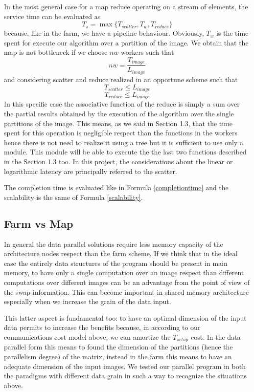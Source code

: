 In the most general case for a map reduce operating on a stream of elements, the service time can be evaluated as
\[
T_{s} = \max\lbrace T_{scatter}, T_{w}, T_{reduce}\rbrace
\]
because, like in the farm, we have a pipeline behaviour. Obviously, $T_{w}$ is the time spent for execute our algorithm over a partition of the image. We obtain that the map is not bottleneck if we choose $nw$ workers such that
\[
nw = \frac{T_{image}}{L_{image}}
\]
and considering scatter and reduce realized in an opportune scheme such that
\[
T_{scatter} \leq L_{image}
\]
\[
T_{reduce} \leq L_{image}
\] 
In this specific case the associative function of the reduce is simply a sum over the partial results obtained by the execution of the algorithm over the single partitions of the image. This means, as we said in Section 1.3, that the time spent for this operation is negligible respect than the functions in the workers hence there is not need to realize it using a tree but it is sufficient to use only a module. This module will be able to execute the the last two functions described in the Section 1.3 too. In this project, the considerations about the linear or logarithmic latency are principally referred to the scatter.

The completion time is evaluated like in Formula \ref{completiontime} and the scalability is the same of Formula \ref{scalability}.

\subsection{Farm vs Map}

In general the data parallel solutions require less memory capacity of the architecture nodes respect than the farm scheme. If we think that in the ideal case the entirely data structures of the program should be present in main memory, to have only a single computation over an image respect than different computations over different images can be an advantage from the point of view of the swap information. This can become important in shared memory architecture especially when we increase the grain of the data input.

This latter aspect is fundamental too: to have an optimal dimension of the input data permits to increase the benefits because, in according to our communications cost model above, we can amortize the $T_{setup}$ cost. In the data parallel form this means to found the dimension of the partitions (hence the parallelism degree) of the matrix, instead in the farm this means to have an adequate dimension of the input images. We tested our parallel program in both the paradigms with different data grain in such a way to recognize the situations above.

